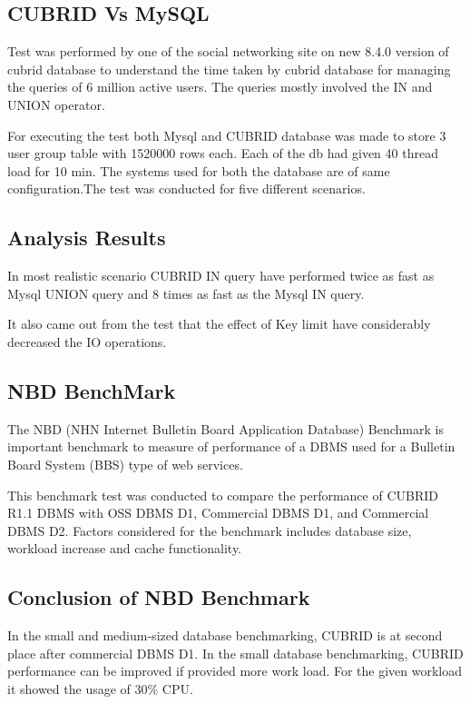 \documentclass[9pt,twocolumn,twoside]{../../styles/osajnl}
\begin{document}
\subsection{CUBRID Vs MySQL}

Test was performed by one of the social networking site on new 8.4.0 
version of cubrid database to understand the time taken by cubrid database 
for managing the queries of 6 million active users. The queries mostly involved 
the IN and UNION operator.  

For executing the test both Mysql and CUBRID database was made to store 3 user
group table with 1520000 rows each. Each of the db had given 40 thread load for 
10 min. The systems used for both the database are of same configuration.The 
test was conducted for five different scenarios.


\subsection{Analysis Results}

In most realistic scenario CUBRID IN query have performed twice as fast as Mysql
UNION query and 8 times as fast as the Mysql IN query. 

It also came out from the test that the effect of Key limit have considerably decreased
the IO operations.


\subsection{NBD BenchMark}
The NBD (NHN Internet Bulletin Board Application Database) Benchmark is important benchmark to 
measure of performance of a DBMS used for a Bulletin Board System (BBS) type of web services.

This benchmark test was conducted to compare the performance of CUBRID R1.1 DBMS with  OSS DBMS 
D1, Commercial DBMS D1, and Commercial DBMS D2. Factors considered for the benchmark includes 
database size, workload increase and cache functionality.


\subsection{Conclusion of NBD Benchmark}

In the small and medium-sized database benchmarking, CUBRID is at second place after commercial DBMS D1. 
In the small database benchmarking, CUBRID performance can be improved if provided more work load. For the 
given workload it showed the usage of 30\% CPU.
\end{document}
